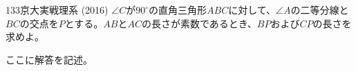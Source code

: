 \begin{prob}{133}{\maru}{京大実戦理系 (2016)}
 $\angle{C}$が$90^\circ$の直角三角形$ABC$に対して、$\angle{A}$の二等分線と$BC$の交点を$P$とする。$AB$と$AC$の長さが素数であるとき、$BP$および$CP$の長さを求めよ。
\end{prob}
ここに解答を記述。